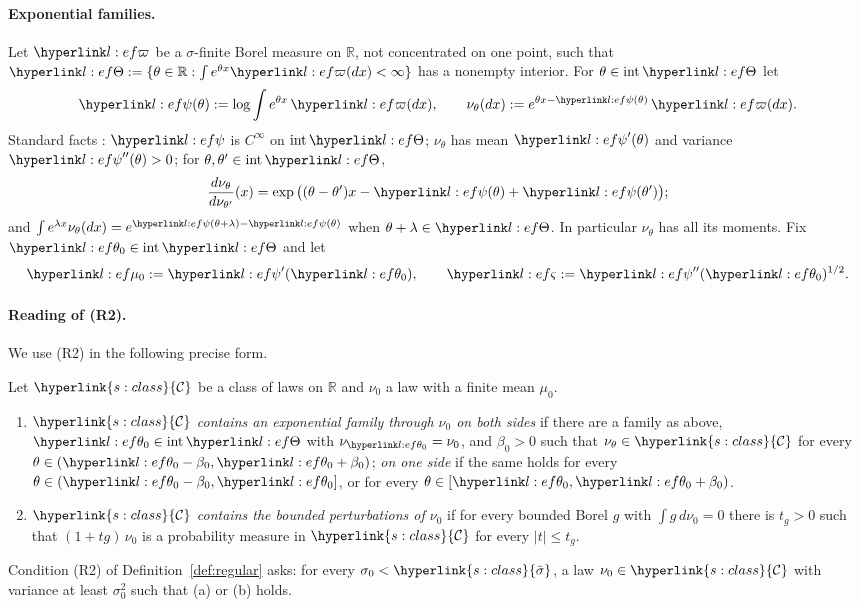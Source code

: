 \documentclass[11pt]{article}
\newcommand{\dt}[1]{\hypertarget{#1}{}}
\DeclareRobustCommand{\sy}[2]{{\hyperlink{#1}{#2}}}
\newcommand{\R}{\mathbb{R}}
\newcommand{\1}{\mathbf{1}}
\newcommand{\Cl}{\sy{s:class}{\mathcal C}}
\newcommand{\sbar}{\sy{s:class}{\bar\sigma}}
\begin{document}
\paragraph{Exponential families.}\dt{l:ef} Let $\lvp$ be a $\sigma$-finite Borel measure on $\R$, not concentrated on one point, such that
$\lTh:=\{\theta\in\R:\int e^{\theta x}\lvp(dx)<\infty\}$ has a nonempty interior. For $\theta\in\operatorname{int}\lTh$ let
\[
\lpsi(\theta):=\log\int e^{\theta x}\,\lvp(dx),\qquad \nu_\theta(dx):=e^{\theta x-\lpsi(\theta)}\,\lvp(dx).
\]
Standard facts \citep{Bro86}: $\lpsi$ is $C^\infty$ on $\operatorname{int}\lTh$; $\nu_\theta$ has mean $\lpsi'(\theta)$ and variance $\lpsi''(\theta)>0$; for
$\theta,\theta'\in\operatorname{int}\lTh$,
\[
\frac{d\nu_\theta}{d\nu_{\theta'}}(x)=\exp\big((\theta-\theta')x-\lpsi(\theta)+\lpsi(\theta')\big);
\]
and $\int e^{\lambda x}\nu_\theta(dx)=e^{\lpsi(\theta+\lambda)-\lpsi(\theta)}$ when $\theta+\lambda\in\lTh$. In particular $\nu_\theta$ has all its moments. Fix
$\lthz\in\operatorname{int}\lTh$ and let
\[
\lmuz:=\lpsi'(\lthz),\qquad \lsd:=\lpsi''(\lthz)^{1/2}.
\]

\paragraph{Reading of (R2).} We use (R2) in the following precise form.

\begin{definition}\label{def:lowR2}
Let $\Cl$ be a class of laws on $\R$ and $\nu_0$ a law with a finite mean $\mu_0$.
\begin{enumerate}
\item[(a)] $\Cl$ \emph{contains an exponential family through $\nu_0$ on both sides} if there are a family as above, $\lthz\in\operatorname{int}\lTh$ with $\nu_{\lthz}=\nu_0$, and
$\beta_0>0$ such that $\nu_\theta\in\Cl$ for every $\theta\in(\lthz-\beta_0,\lthz+\beta_0)$; \emph{on one side} if the same holds for every $\theta\in(\lthz-\beta_0,\lthz]$,
or for every $\theta\in[\lthz,\lthz+\beta_0)$.
\item[(b)] $\Cl$ \emph{contains the bounded perturbations of $\nu_0$} if for every bounded Borel $g$ with $\int g\,d\nu_0=0$ there is $t_g>0$ such that $(1+tg)\,\nu_0$ is a
probability measure in $\Cl$ for every $|t|\le t_g$.
\end{enumerate}
\end{definition}

\noindent Condition (R2) of Definition~\ref{def:regular} asks: for every $\sigma_0<\sbar$, a law $\nu_0\in\Cl$ with variance at least $\sigma_0^2$ such that (a) or (b) holds.
\end{document}
